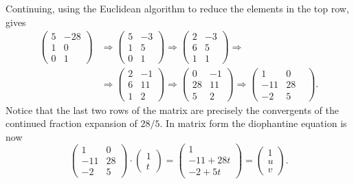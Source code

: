 Continuing, using the Euclidean algorithm to reduce the elements in
the top row, gives
\[
\begin{aligned}
\begin{pmatrix}5 & -28 \\ 1 & 0 \\ 0 & 1\end{pmatrix}
&\Longrightarrow
\begin{pmatrix}5 & -3 \\ 1 & 5 \\ 0 & 1\end{pmatrix} 
\Longrightarrow
\begin{pmatrix}2 & -3 \\ 6 & 5 \\ 1 & 1\end{pmatrix} 
\Longrightarrow \\
&\Longrightarrow 
\begin{pmatrix}2 & -1 \\ 6 & 11 \\ 1 & 2\end{pmatrix} 
\Longrightarrow
\begin{pmatrix}0 & -1 \\ 28 & 11 \\ 5 & 2\end{pmatrix} 
\Longrightarrow
\begin{pmatrix}1 &0 &\\ -11 & 28 \\ -2 & 5\end{pmatrix}.
\end{aligned}
\]
Notice that the last two rows of the matrix are precisely the
convergents of the continued fraction expansion of $28/5$.
In matrix form the diophantine equation is now
\[
\begin{pmatrix}1 &0 \\ -11 & 28 \\ -2 & 5\end{pmatrix} \cdot \begin{pmatrix}1 \\ t\end{pmatrix} = 
\begin{pmatrix}1 \\ -11 + 28t \\ -2 + 5t\end{pmatrix} =
\begin{pmatrix}1 \\ u \\ v\end{pmatrix}.
\]

